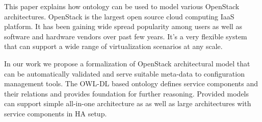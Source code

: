 
This paper explains how ontology can be used to model various OpenStack architectures. OpenStack is the largest open source cloud computing IaaS platform. It has been gaining wide spread popularity among users as well as software and hardware vendors over past few years. It's a very flexible system that can support a wide range of virtualization scenarios at any scale.

In our work we propose a formalization of OpenStack architectural model that can be automatically validated and serve suitable meta-data to configuration management tools. The OWL-DL based ontology defines service components and their relations and  provides foundation for further reasoning. Provided models can support simple all-in-one architecture as as well as large architectures with service components in HA setup.